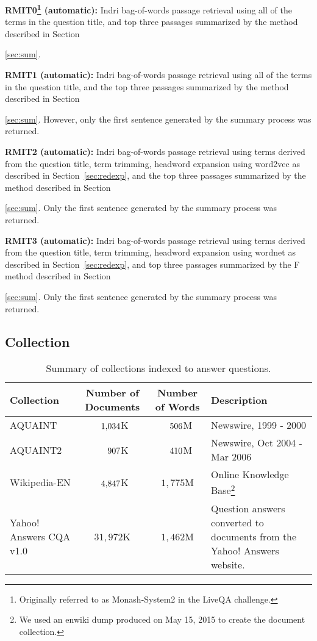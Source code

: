 \documentclass[a4paper,10pt,conference,compsocconf,final]{IEEEtran}
\newcommand\method[1]{{\sf\small{#1}}}
\def\D{\hphantom{1}}
\def\C{\hphantom{1,}}
\begin{document}
\noindent\textbf{RMIT0\footnote{Originally referred to as
Monash-System2 in the LiveQA challenge.}
(automatic): } Indri bag-of-words passage retrieval using all of the
terms in the question title, and top three passages summarized by the method
described in Section~{\ref{sec:sum}.

\medskip

\noindent\textbf{RMIT1 (automatic): } Indri bag-of-words passage
retrieval using all of the terms in the question title, and the
top three passages summarized by the method described in
Section~{\ref{sec:sum}.
However, only the first sentence generated by the summary process was
returned.

\medskip

\noindent\textbf{RMIT2 (automatic): } Indri bag-of-words passage
retrieval using terms derived from the question title, term trimming,
headword expansion using {\method{word2vec}} as described in
Section~{\ref{sec:redexp}}, and the top three passages summarized by
the method described in Section~{\ref{sec:sum}.
Only the first sentence generated by the summary process was
returned.

\medskip

\noindent\textbf{RMIT3 (automatic): } Indri bag-of-words passage
retrieval using terms derived from the question title, term trimming,
headword expansion using \method{wordnet} as described in 
Section~{\ref{sec:redexp}}, and top three passages summarized by the F
method described in Section~{\ref{sec:sum}.  Only the first
sentence generated by the summary process was returned.

\medskip

\subsection{Collection}

\begin{table*}[!t]
\centering
\caption{Summary of collections indexed to answer questions.\label{tbl:col}}
\begin{tabular}{p{35mm}ccp{50mm}}
\toprule
{\bf Collection} & {\bf Number of Documents} & {\bf Number of Words} & {\bf Description} \\
\midrule
AQUAINT & $\D1{,}034$K & $\C506$M & Newswire, 1999 - 2000 \\
AQUAINT2 & $\D\C907$K & $\C410$M & Newswire, Oct 2004 - Mar 2006 \\
Wikipedia-EN & $\D4{,}847$K & $1{,}775$M & Online Knowledge Base\footnote{We used an enwiki dump produced on May 15, 2015 to create the document collection.} \\
Yahoo! Answers CQA v1.0 & $31{,}972$K & $1{,}462$M & Question answers converted to documents from the Yahoo! Answers website.
\\
\bottomrule
\end{tabular}
\end{table*}

}}}}
\end{document}
